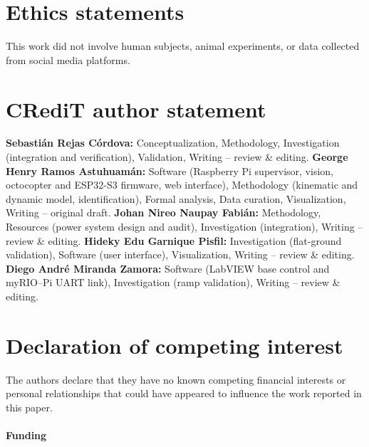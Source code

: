 \section*{Ethics statements}
This work did not involve human subjects, animal experiments, or data collected from social media platforms.

\section*{CRediT author statement}
\textbf{Sebastián Rejas Córdova:} Conceptualization, Methodology, Investigation (integration and verification), Validation, Writing -- review \& editing.
\textbf{George Henry Ramos Astuhuamán:} Software (Raspberry Pi supervisor, vision, octocopter and ESP32-S3 firmware, web interface), Methodology (kinematic and dynamic model, identification), Formal analysis, Data curation, Visualization, Writing -- original draft.
\textbf{Johan Nireo Naupay Fabián:} Methodology, Resources (power system design and audit), Investigation (integration), Writing -- review \& editing.
\textbf{Hideky Edu Garnique Pisfil:} Investigation (flat-ground validation), Software (user interface), Visualization, Writing -- review \& editing.
\textbf{Diego André Miranda Zamora:} Software (LabVIEW base control and myRIO--Pi UART link), Investigation (ramp validation), Writing -- review \& editing.

\section*{Declaration of competing interest}
The authors declare that they have no known competing financial interests or personal relationships that could have appeared to influence the work reported in this paper.

\paragraph{Funding}

